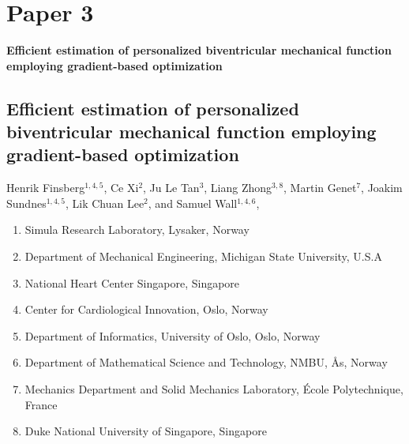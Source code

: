 

\graphicspath{{chapters/paper3/}}


\chapter{Paper 3}
{\Huge \textbf{Efficient estimation of personalized biventricular mechanical
  function employing gradient-based optimization}}

\newpage
\section*{Efficient estimation of personalized biventricular mechanical
  function employing gradient-based optimization}

  Henrik Finsberg$^{1,4,5}$,
  Ce Xi$^{2}$,
  Ju Le Tan$^3$,
  Liang Zhong$^{3,8}$,
  Martin Genet$^7$,
  Joakim Sundnes$^{1,4,5}$,
  Lik Chuan Lee$^2$, and
  Samuel Wall$^{1,4,6}$,

\footnotesize
\begin{enumerate}[itemsep=-2mm]
\item{Simula Research Laboratory, Lysaker, Norway}
\item{Department of Mechanical Engineering, Michigan State
    University, U.S.A}
\item{National Heart Center Singapore, Singapore}
\item{Center for Cardiological Innovation, Oslo, Norway}
\item{Department of Informatics, University of Oslo, Oslo, Norway}
\item{Department of Mathematical Science and Technology, NMBU, \r{A}s,
    Norway}
\item{Mechanics Department and Solid Mechanics Laboratory, \'{E}cole
    Polytechnique, France}
\item{Duke National University of Singapore, Singapore}
\end{enumerate}
\normalsize




